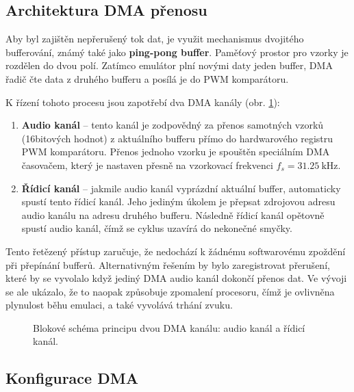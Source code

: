 \subsection{Architektura DMA přenosu}

Aby byl zajištěn nepřerušený tok dat, je využit mechanismus dvojitého bufferování, známý také jako
\textbf{ping-pong buffer}\cite{pingpong-buf}. Paměťový prostor pro vzorky je rozdělen do dvou polí.
Zatímco emulátor plní novými daty jeden buffer, DMA řadič čte data z druhého bufferu a posílá
je do PWM komparátoru.

\newpage

K řízení tohoto procesu jsou zapotřebí dva DMA kanály (obr. \ref{fig:dma_channels}):

\begin{enumerate}
    \item \textbf{Audio kanál} -- tento kanál je zodpovědný za přenos samotných vzorků (16bitových
        hodnot) z aktuálního bufferu přímo do hardwarového registru PWM komparátoru. Přenos jednoho
        vzorku je spouštěn speciálním DMA časovačem, který je nastaven přesně na vzorkovací
        frekvenci $f_s = \SI{31.25}{\kilo\hertz}$.
    \item \textbf{Řídicí kanál} -- jakmile audio kanál vyprázdní aktuální buffer, automaticky spustí
        tento řídicí kanál. Jeho jediným úkolem je přepsat zdrojovou adresu audio kanálu na adresu
        druhého bufferu. Následně řídicí kanál opětovně spustí audio kanál, čímž se cyklus uzavírá
        do nekonečné smyčky.
\end{enumerate}

Tento řetězený přístup zaručuje, že nedochází k žádnému softwarovému zpoždění při přepínání bufferů.
Alternativným řešením by bylo zaregistrovat přerušení, které by se vyvolalo když jediný DMA audio
kanál dokončí přenos dat. Ve vývoji se ale ukázalo, že to naopak způsobuje zpomalení procesoru, čímž
je ovlivněna plynulost běhu emulaci, a také vyvolává trhání zvuku.

\begin{figure}[htbp]
    \centering
    
    \caption{Blokové schéma principu dvou DMA kanálu: audio kanál a řídicí kanál.}
    \label{fig:dma_channels}
\end{figure}

\subsection{Konfigurace DMA}

